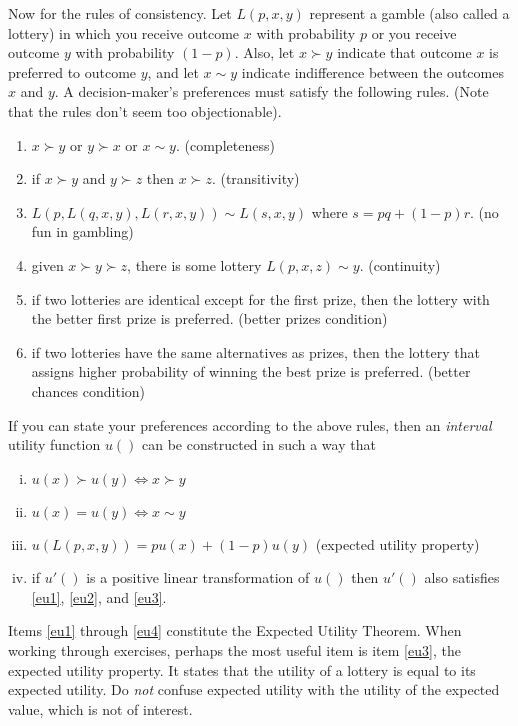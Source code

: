 \label{rules-of-consistency}
Now for the rules of consistency. Let $L(p,x,y)$ represent a gamble
(also called a lottery) in which you receive outcome $x$ with
probability $p$ or you receive outcome $y$ with probability
$(1-p)$. Also, let $x \succ y$ indicate that outcome $x$ is preferred
to outcome $y$, and let $x \sim y$ indicate indifference between the
outcomes $x$ and $y$. A decision-maker's preferences must satisfy the
following rules. (Note that the rules don't seem too objectionable).
\begin{enumerate}
\item $x \succ y$ or $y \succ x$ or $x \sim y$. (completeness)
\item if $x \succ y$ and $y \succ z$ then $x \succ z$. (transitivity)
\item $L\left(p,L(q,x,y),L(r,x,y)\right) \sim L(s,x,y)$ where $s=pq+(1-p)r$. (no fun in gambling)
\item given $x \succ y \succ z$, there is some lottery $L(p,x,z) \sim y$. (continuity)
\item if two lotteries are identical except for the first prize, then the
  lottery with the better first prize is preferred. (better prizes condition)
\item if two lotteries have the same alternatives as prizes, then the
  lottery that assigns higher probability of winning the best prize is
  preferred. (better chances condition)
\end{enumerate}
If you can state your preferences according to the above rules,
then an \emph{interval} utility function $u()$ can be constructed
in such a way that
\begin{enumerate}[i)]
\item $u(x) \succ u(y) \iff x \succ y$ \label{eu1}
\item $u(x) = u(y) \iff x \sim y$ \label{eu2}
\item $u\left(L(p,x,y)\right) = pu(x) + (1-p)u(y)$ 
(expected utility property) \label{eu3}
\item if $u'()$ is a positive linear transformation of $u()$ then
  $u'()$ also satisfies \ref{eu1}, \ref{eu2}, and \ref{eu3}. \label{eu4}
\end{enumerate}
Items \ref{eu1} through \ref{eu4} constitute the Expected Utility
Theorem.  When working through exercises, perhaps the most useful item is
item \ref{eu3}, the expected utility property. It states that the utility
of a lottery is equal to its expected utility. Do \emph{not} confuse
expected utility with the utility of the expected value, which is not
of interest.

